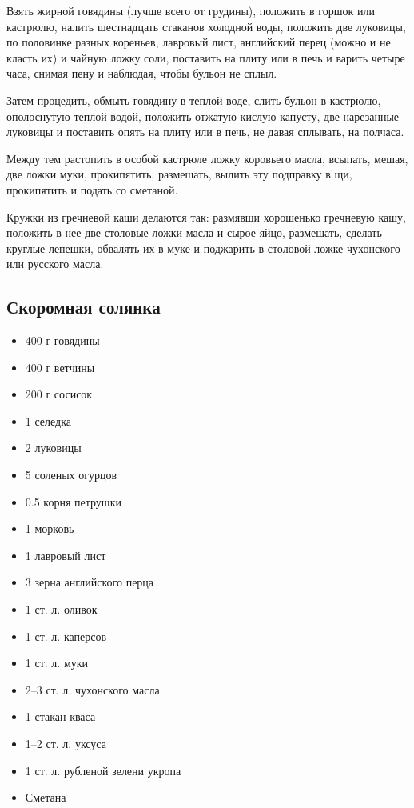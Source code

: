 Взять жирной говядины (лучше всего от грудины), положить в горшок или кастрюлю, налить шестнадцать стаканов холодной воды, положить две луковицы, по половинке разных кореньев, лавровый лист, английский перец (можно и не класть их) и чайную ложку соли, поставить на плиту или в печь и варить четыре часа, снимая пену и наблюдая, чтобы бульон не сплыл.

Затем процедить, обмыть говядину в теплой воде, слить бульон в кастрюлю, ополоснутую теплой водой, положить отжатую кислую капусту, две нарезанные луковицы и поставить опять на плиту или в печь, не давая сплывать, на полчаса.

Между тем растопить в особой кастрюле ложку коровьего масла, всыпать, мешая, две ложки муки, прокипятить, размешать, вылить эту подправку в щи, прокипятить и подать со сметаной.

Кружки из гречневой каши делаются так: размявши хорошенько гречневую кашу, положить в нее две столовые ложки масла и сырое яйцо, размешать, сделать круглые лепешки, обвалять их в муке и поджарить в столовой ложке чухонского или русского масла.

\subsection{Скоромная солянка}\label{29solianka-skorom}

\begin{itemize}
	\item 400 г говядины 
	\item 400 г ветчины 
	\item 200 г сосисок 
	\item 1 селедка 
	\item 2 луковицы 
	\item 5 соленых огурцов 
	\item 0.5 корня петрушки 
	\item 1 морковь 
	\item 1 лавровый лист 
	\item 3 зерна английского перца 
	\item 1 ст. л. оливок 
	\item 1 ст. л. каперсов 
	\item 1 ст. л. муки 
	\item 2–3 ст. л. чухонского масла  
	\item 1 стакан кваса 
	\item 1–2 ст. л. уксуса 
	\item 1 ст. л. рубленой зелени укропа 
	\item Сметана
\end{itemize}
    
